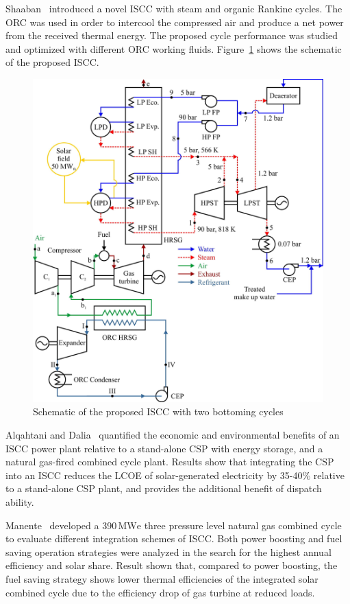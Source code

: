 Shaaban~\cite{Shaaban2016} introduced a novel ISCC with steam and organic Rankine cycles. The ORC was used in order to intercool the compressed air and produce a net power from the received thermal energy. The proposed cycle performance was studied and optimized with different ORC working fluids. Figure~\ref{fig:Shaaban2016} shows the schematic of the proposed ISCC.
\begin{figure}[!ht]
\centering
\includegraphics[width=.8\textwidth]{fig/Shaaban2016.jpg}
\caption{Schematic of the proposed ISCC with two bottoming cycles}\label{fig:Shaaban2016}
\end{figure}

Alqahtani and Dalia~\cite{Alqahtani2016} quantified the economic and environmental benefits of an ISCC power plant relative to a stand-alone CSP with energy storage, and a natural gas-fired combined cycle plant. Results show that integrating the CSP into an ISCC reduces the LCOE of solar-generated electricity by 35-40\% relative to a stand-alone CSP plant, and provides the additional benefit of dispatch ability.

Manente~\cite{Manente2016} developed a 390$\,\mathrm{MWe}$ three pressure level natural gas combined cycle to evaluate different integration schemes of ISCC. Both power boosting and fuel saving operation strategies were analyzed in the search for the highest annual efficiency and solar share. Result shown that, compared to power boosting, the fuel saving strategy shows lower thermal efficiencies of the integrated solar combined cycle due to the efficiency drop of gas turbine at reduced loads.

